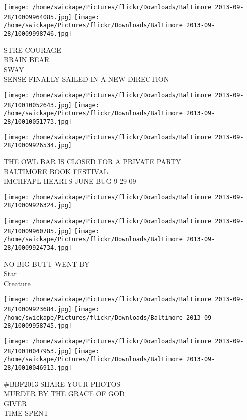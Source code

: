 \documentclass[10pt,letterpaper]{article}
\begin{document}
\texttt{[image: /home/swickape/Pictures/flickr/Downloads/Baltimore 2013-09-28/10009964085.jpg]}
\texttt{[image: /home/swickape/Pictures/flickr/Downloads/Baltimore 2013-09-28/10009998746.jpg]}

STRE COURAGE\\
BRAIN BEAR\\
SWAY\\
SENSE FINALLY SAILED IN A NEW DIRECTION
\pagebreak

\texttt{[image: /home/swickape/Pictures/flickr/Downloads/Baltimore 2013-09-28/10010052643.jpg]}
\texttt{[image: /home/swickape/Pictures/flickr/Downloads/Baltimore 2013-09-28/10010051773.jpg]}

\vspace{0.25in}
\texttt{[image: /home/swickape/Pictures/flickr/Downloads/Baltimore 2013-09-28/10009926534.jpg]}

THE OWL BAR IS CLOSED FOR A PRIVATE PARTY\\
BALTIMORE BOOK FESTIVAL\\
IMCHFAPL HEARTS JUNE BUG 9{-}29{-}09
\pagebreak

\texttt{[image: /home/swickape/Pictures/flickr/Downloads/Baltimore 2013-09-28/10009926324.jpg]}

\vspace{0.25in}
\texttt{[image: /home/swickape/Pictures/flickr/Downloads/Baltimore 2013-09-28/10009960785.jpg]}
\texttt{[image: /home/swickape/Pictures/flickr/Downloads/Baltimore 2013-09-28/10009924734.jpg]}

NO BIG BUTT WENT BY\\
Star\\
Creature
\pagebreak

\texttt{[image: /home/swickape/Pictures/flickr/Downloads/Baltimore 2013-09-28/10009923684.jpg]}
\texttt{[image: /home/swickape/Pictures/flickr/Downloads/Baltimore 2013-09-28/10009958745.jpg]}

\texttt{[image: /home/swickape/Pictures/flickr/Downloads/Baltimore 2013-09-28/10010047953.jpg]}
\texttt{[image: /home/swickape/Pictures/flickr/Downloads/Baltimore 2013-09-28/10010046913.jpg]}

\#BBF2013 SHARE YOUR PHOTOS\\
MURDER BY THE GRACE OF GOD\\
GIVER\\
TIME SPENT
\pagebreak
\end{document}

